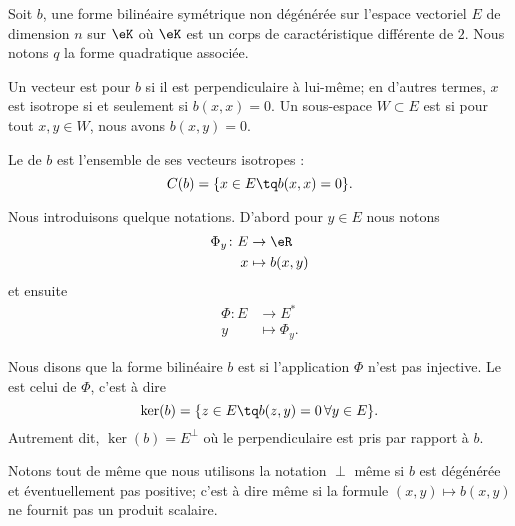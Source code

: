 Soit \( b\), une forme bilinéaire symétrique non dégénérée  sur l'espace vectoriel \( E\) de dimension \( n\) sur \( \eK\) où \( \eK\) est un corps de caractéristique différente de \( 2\). Nous notons \( q\) la forme quadratique associée.
\begin{definition}[Isotropie]   \label{DefVKMnUEM}
    Un vecteur est  pour \( b\) si il est perpendiculaire à lui-même; en d'autres termes, \( x\) est isotrope si et seulement si \( b(x,x)=0\). Un sous-espace \( W\subset E\) est  si pour tout \( x,y\in W\), nous avons \( b(x,y)=0\).

    Le  de \( b\) est l'ensemble de ses vecteurs isotropes :
    \begin{equation}
        C(b)=\{ x\in E\tq b(x,x)=0 \}.
    \end{equation}
\end{definition}
Nous introduisons quelque notations. D'abord pour \( y\in E\) nous notons
\begin{equation}
    \begin{aligned}
        \Phi_y\colon E&\to \eR \\
        x&\mapsto b(x,y) 
    \end{aligned}
\end{equation}
et ensuite
\begin{equation}
    \begin{aligned}
        \Phi\colon E&\to E^* \\
        y&\mapsto \Phi_y. 
    \end{aligned}
\end{equation}
\begin{definition}
    Nous disons que la forme bilinéaire \( b\) est  si l'application \( \Phi\) n'est pas injective. Le  est celui de \( \Phi\), c'est à dire
    \begin{equation}
        \ker(b)=\{ z\in E\tq b(z,y)=0\,\forall y\in E \}.
    \end{equation}
    Autrement dit, \( \ker(b)=E^{\perp}\) où le perpendiculaire est pris par rapport à \( b\).
\end{definition}
Notons tout de même que nous utilisons la notation \( \perp\) même si \( b\) est dégénérée et éventuellement pas positive; c'est à dire même si la formule \( (x,y)\mapsto b(x,y)\) ne fournit pas un produit scalaire.

